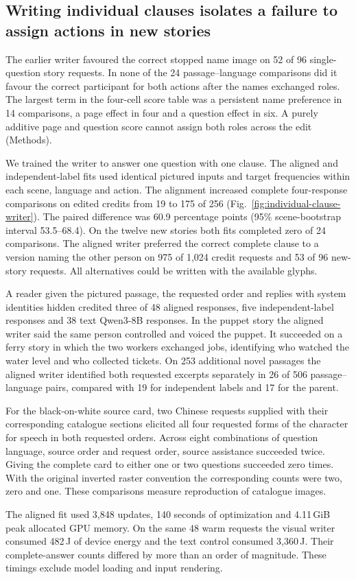 \subsection*{Writing individual clauses isolates a failure to assign actions in new stories}
The earlier writer favoured the correct stopped name image on 52 of 96 single-question story requests. In none of the 24 passage--language comparisons did it favour the correct participant for both actions after the names exchanged roles. The largest term in the four-cell score table was a persistent name preference in 14 comparisons, a page effect in four and a question effect in six. A purely additive page and question score cannot assign both roles across the edit (Methods).

We trained the writer to answer one question with one clause. The aligned and independent-label fits used identical pictured inputs and target frequencies within each scene, language and action. The alignment increased complete four-response comparisons on edited credits from 19 to 175 of 256 (Fig.~\ref{fig:individual-clause-writer}). The paired difference was 60.9 percentage points (95\% scene-bootstrap interval 53.5--68.4). On the twelve new stories both fits completed zero of 24 comparisons. The aligned writer preferred the correct complete clause to a version naming the other person on 975 of 1,024 credit requests and 53 of 96 new-story requests. All alternatives could be written with the available glyphs.

A reader given the pictured passage, the requested order and replies with system identities hidden credited three of 48 aligned responses, five independent-label responses and 38 text Qwen3-8B responses. In the puppet story the aligned writer said the same person controlled and voiced the puppet. It succeeded on a ferry story in which the two workers exchanged jobs, identifying who watched the water level and who collected tickets. On 253 additional novel passages the aligned writer identified both requested excerpts separately in 26 of 506 passage--language pairs, compared with 19 for independent labels and 17 for the parent.

For the black-on-white source card, two Chinese requests supplied with their corresponding catalogue sections elicited all four requested forms of the character for speech in both requested orders. Across eight combinations of question language, source order and request order, source assistance succeeded twice. Giving the complete card to either one or two questions succeeded zero times. With the original inverted raster convention the corresponding counts were two, zero and one. These comparisons measure reproduction of catalogue images.

The aligned fit used 3,848 updates, 140 seconds of optimization and 4.11\,GiB peak allocated GPU memory. On the same 48 warm requests the visual writer consumed 482\,J of device energy and the text control consumed 3,360\,J. Their complete-answer counts differed by more than an order of magnitude. These timings exclude model loading and input rendering.
